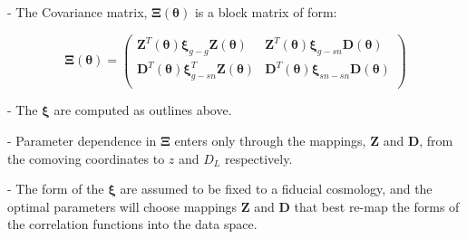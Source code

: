 \documentclass{article}
\begin{document}
- The Covariance matrix, $\boldsymbol{\Xi}(\boldsymbol{\theta})$ is a block matrix of form:

\begin{equation}
\boldsymbol{\Xi}(\boldsymbol{\theta}) = \left(
\begin{array}{cc} 
\boldsymbol{Z}^T(\boldsymbol{\theta}) \boldsymbol{\xi}_{g-g} \boldsymbol{Z}(\boldsymbol{\theta})  & \boldsymbol{Z}^T(\boldsymbol{\theta}) \boldsymbol{\xi}_{g-sn} \boldsymbol{D}(\boldsymbol{\theta})\\
\boldsymbol{D}^T(\boldsymbol{\theta}) \boldsymbol{\xi}_{g-sn}^T \boldsymbol{Z}(\boldsymbol{\theta}) & \boldsymbol{D}^T(\boldsymbol{\theta}) \boldsymbol{\xi}_{sn-sn} \boldsymbol{D}(\boldsymbol{\theta})\\ 
\end{array} 
\right)
\end{equation}

- The $\boldsymbol{\xi}$ are computed as outlines above. 

- Parameter dependence in $\boldsymbol{\Xi}$ enters only through the mappings, $\boldsymbol{Z}$ and $\boldsymbol{D}$, from the comoving coordinates to $z$ and $D_L$ respectively. 

- The form of the $\boldsymbol{\xi}$ are assumed to be fixed to a fiducial cosmology, and the optimal parameters will choose mappings $\boldsymbol{Z}$ and $\boldsymbol{D}$ that best re-map the forms of the correlation functions into the data space. 
\end{document}

